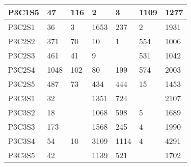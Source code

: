 \begin{longtable}{lllllll}
\multicolumn{1}{|l|}{P3C1S5} & \multicolumn{1}{l|}{47} & \multicolumn{1}{l|}{116} & \multicolumn{1}{l|}{2} & \multicolumn{1}{l|}{3} & \multicolumn{1}{l|}{1109} & \multicolumn{1}{l|}{1277} \\ \hline
\multicolumn{1}{|l|}{P3C2S1} & \multicolumn{1}{l|}{36} & \multicolumn{1}{l|}{3} & \multicolumn{1}{l|}{1653} & \multicolumn{1}{l|}{237} & \multicolumn{1}{l|}{2} & \multicolumn{1}{l|}{1931} \\ \hline
\multicolumn{1}{|l|}{P3C2S2} & \multicolumn{1}{l|}{371} & \multicolumn{1}{l|}{70} & \multicolumn{1}{l|}{10} & \multicolumn{1}{l|}{1} & \multicolumn{1}{l|}{554} & \multicolumn{1}{l|}{1006} \\ \hline
\multicolumn{1}{|l|}{P3C2S3} & \multicolumn{1}{l|}{461} & \multicolumn{1}{l|}{41} & \multicolumn{1}{l|}{9} & \multicolumn{1}{l|}{} & \multicolumn{1}{l|}{531} & \multicolumn{1}{l|}{1042} \\ \hline
\multicolumn{1}{|l|}{P3C2S4} & \multicolumn{1}{l|}{1048} & \multicolumn{1}{l|}{102} & \multicolumn{1}{l|}{80} & \multicolumn{1}{l|}{199} & \multicolumn{1}{l|}{574} & \multicolumn{1}{l|}{2003} \\ \hline
\multicolumn{1}{|l|}{P3C2S5} & \multicolumn{1}{l|}{487} & \multicolumn{1}{l|}{73} & \multicolumn{1}{l|}{434} & \multicolumn{1}{l|}{444} & \multicolumn{1}{l|}{15} & \multicolumn{1}{l|}{1453} \\ \hline
\multicolumn{1}{|l|}{P3C3S1} & \multicolumn{1}{l|}{32} & \multicolumn{1}{l|}{} & \multicolumn{1}{l|}{1351} & \multicolumn{1}{l|}{724} & \multicolumn{1}{l|}{} & \multicolumn{1}{l|}{2107} \\ \hline
\multicolumn{1}{|l|}{P3C3S2} & \multicolumn{1}{l|}{18} & \multicolumn{1}{l|}{} & \multicolumn{1}{l|}{1068} & \multicolumn{1}{l|}{598} & \multicolumn{1}{l|}{5} & \multicolumn{1}{l|}{1689} \\ \hline
\multicolumn{1}{|l|}{P3C3S3} & \multicolumn{1}{l|}{173} & \multicolumn{1}{l|}{} & \multicolumn{1}{l|}{1568} & \multicolumn{1}{l|}{245} & \multicolumn{1}{l|}{4} & \multicolumn{1}{l|}{1990} \\ \hline
\multicolumn{1}{|l|}{P3C3S4} & \multicolumn{1}{l|}{54} & \multicolumn{1}{l|}{10} & \multicolumn{1}{l|}{3109} & \multicolumn{1}{l|}{1114} & \multicolumn{1}{l|}{4} & \multicolumn{1}{l|}{4291} \\ \hline
\multicolumn{1}{|l|}{P3C3S5} & \multicolumn{1}{l|}{42} & \multicolumn{1}{l|}{} & \multicolumn{1}{l|}{1139} & \multicolumn{1}{l|}{521} & \multicolumn{1}{l|}{} & \multicolumn{1}{l|}{1702} \\ \hline

\end{longtable}
